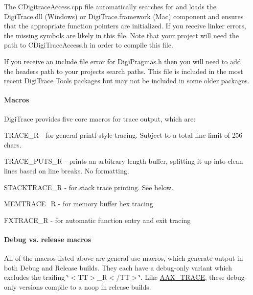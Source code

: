 \begin{DoxyItemize}
\item The C\+Digitrace\+Access.\+cpp file automatically searches for and loads the Digi\+Trace.\+dll (Windows) or Digi\+Trace.\+framework (Mac) component and ensures that the appropriate function pointers are initialized. If you receive linker errors, the missing symbols are likely in this file. Note that your project will need the path to C\+Digi\+Trace\+Access.\+h in order to compile this file.
\item If you receive an include file error for Digi\+Pragmas.\+h then you will need to add the header\textquotesingle{}s path to your project\textquotesingle{}s search paths. This file is included in the most recent Digi\+Trace Tools packages but may not be included in some older packages.
\end{DoxyItemize}

\hypertarget{a00364_digitrace__advancedlogging__macros}{}\paragraph{Macros}\label{a00364_digitrace__advancedlogging__macros}
 Digi\+Trace provides five core macros for trace output, which are\+:


\begin{DoxyItemize}
\item {\ttfamily T\+R\+A\+C\+E\+\_\+\+R } -\/ for general printf style tracing. Subject to a total line limit of 256 chars.
\item {\ttfamily T\+R\+A\+C\+E\+\_\+\+P\+U\+T\+S\+\_\+\+R } -\/ prints an arbitrary length buffer, splitting it up into clean lines based on line breaks. No formatting.
\item {\ttfamily S\+T\+A\+C\+K\+T\+R\+A\+C\+E\+\_\+\+R } -\/ for stack trace printing. See below.
\item {\ttfamily M\+E\+M\+T\+R\+A\+C\+E\+\_\+\+R } -\/ for memory buffer hex tracing
\item {\ttfamily F\+X\+T\+R\+A\+C\+E\+\_\+\+R } -\/ for automatic function entry and exit tracing
\end{DoxyItemize}

\hypertarget{a00364_digitrace__advancedlogging__macros__debugvsrelease}{}\paragraph{Debug vs. release macros}\label{a00364_digitrace__advancedlogging__macros__debugvsrelease}
 All of the macros listed above are general-\/use macros, which generate output in both Debug and Release builds. They each have a debug-\/only variant which excludes the trailing \char`\"{}$<$\+T\+T$>$\+\_\+\+R$<$/\+T\+T$>$\char`\"{}. Like \hyperlink{a00158_ab53f1d6a94f8b6ebb3a101f71bfe4e82}{A\+A\+X\+\_\+\+T\+R\+A\+C\+E}, these debug-\/only versions compile to a noop in release builds.

